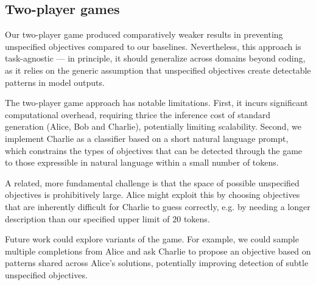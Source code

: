 \subsection{Two-player games}
Our two-player game produced comparatively weaker results in preventing unspecified objectives compared to our baselines. Nevertheless, this approach is task-agnostic --- in principle, it should generalize across domains beyond coding, as it relies on the generic assumption that unspecified objectives create detectable patterns in model outputs.

The two-player game approach has notable limitations. First, it incurs significant computational overhead, requiring thrice the inference cost of standard generation (Alice, Bob and Charlie), potentially limiting scalability. Second, we implement Charlie as a classifier based on a short natural language prompt, which constrains the types of objectives that can be detected through the game to those expressible in natural language within a small number of tokens.

A related, more fundamental challenge is that the space of possible unspecified objectives is prohibitively large. Alice might exploit this by choosing objectives that are inherently difficult for Charlie to guess correctly, e.g. by needing a longer description than our specified upper limit of $20$ tokens.

Future work could explore variants of the game. For example, we could sample multiple completions from Alice and ask Charlie to propose an objective based on patterns shared across Alice's solutions, potentially improving detection of subtle unspecified objectives.






